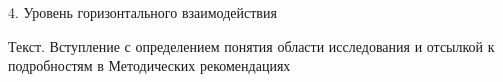 \begin{frame}{4. Уровень горизонтального взаимодействия}

\tiny
Текст. Вступление с определением понятия области исследования и отсылкой к подробностям в Методических рекомендациях

\end{frame}


